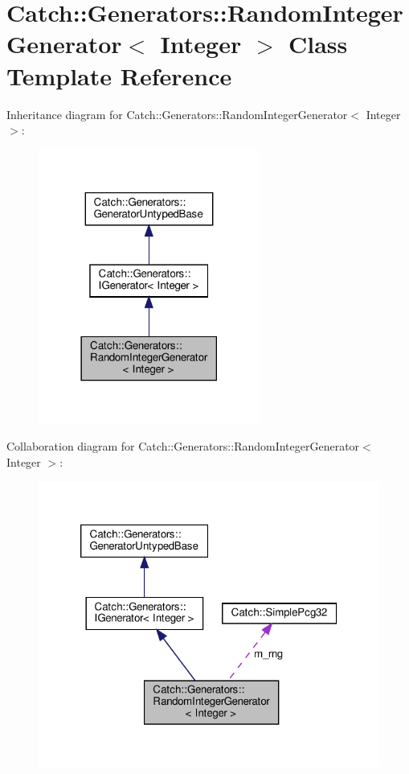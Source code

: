 \hypertarget{classCatch_1_1Generators_1_1RandomIntegerGenerator}{}\section{Catch\+:\+:Generators\+:\+:Random\+Integer\+Generator$<$ Integer $>$ Class Template Reference}
\label{classCatch_1_1Generators_1_1RandomIntegerGenerator}


Inheritance diagram for Catch\+:\+:Generators\+:\+:Random\+Integer\+Generator$<$ Integer $>$\+:
\nopagebreak
\begin{figure}[H]
\begin{center}
\leavevmode
\includegraphics[width=206pt]{classCatch_1_1Generators_1_1RandomIntegerGenerator__inherit__graph}
\end{center}
\end{figure}


Collaboration diagram for Catch\+:\+:Generators\+:\+:Random\+Integer\+Generator$<$ Integer $>$\+:
\nopagebreak
\begin{figure}[H]
\begin{center}
\leavevmode
\includegraphics[width=320pt]{classCatch_1_1Generators_1_1RandomIntegerGenerator__coll__graph}
\end{center}
\end{figure}
